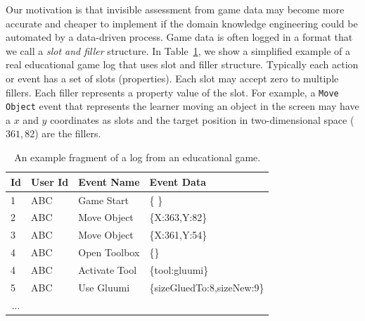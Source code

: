 \documentclass{sigchi}
\begin{document}
Our motivation is that invisible assessment from game data may become more accurate and cheaper to implement if the domain knowledge engineering could be automated by a data-driven process.
Game data is often logged  in a format that we call a \textit{slot and filler} structure.
In Table~\ref{tbl:log_example}, we show a simplified example of a real educational game log that uses slot and filler structure.
Typically each action or event has a set of slots (properties).
Each slot may accept zero to multiple fillers. 
Each filler represents a property value of the slot.
For example, a \texttt{Move Object} event  that represents the learner moving an object in the screen may have a $x$ and $y$ coordinates as slots and the target position in two-dimensional space ($361, 82$) are the fillers.
\newline

\begin{table}[tbh]
	\begin{tabular}{@{}llll@{}}
		\toprule
		\textbf{Id}             & \textbf{User Id} & \textbf{Event Name} & \textbf{Event Data}        \\ \midrule
		1                       & ABC              & Game Start          & \{ \}                        \\
		2                       & ABC              & Move Object         & \{X:363,Y:82\} \\
		3                       & ABC              & Move Object         & \{X:361,Y:54\} \\
		4                       & ABC              & Open Toolbox        & \{\}        \\
		4                       & ABC              & Activate Tool        & \{tool:gluumi\}        \\
		5                       & ABC              & Use Gluumi        & \{sizeGluedTo:8,sizeNew:9\} \\        
		\multicolumn{1}{c}{...} &                  &                     &                            \\ \bottomrule
	\end{tabular}
	\caption{An example fragment of a log from an educational game. \label{tbl:log_example}}
\end{table}

\end{document}

